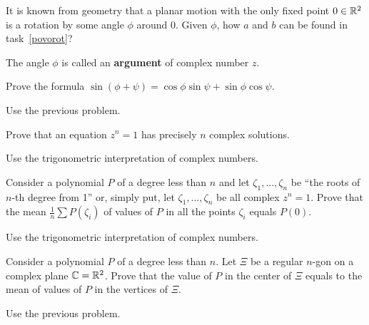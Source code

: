 \documentclass[12pt]{article}
\begin{document}
\begin{zadacha}[!]
  It is known from geometry that a planar motion with the only fixed
  point $0 \in {\mathbb R}^2$ is a rotation by some angle $\phi$ around $0$.
  Given $\phi$, how $a$ and $b$ can be found in task~\ref{povorot}?
\end{zadacha}

\begin{zamechanie}
The angle $\phi$ is called an {\bf argument} of complex number $z$.
\end{zamechanie}

\begin{zadacha}[!]
Prove the formula $\sin (\phi +\psi)= \cos\phi \sin \psi +
\sin\phi \cos \psi$.
\end{zadacha}

\begin{ukazanie}
Use the previous problem.
\end{ukazanie}

\begin{zadacha}[!]
Prove that an equation $z^n =1$ has precisely $n$ complex solutions.
\end{zadacha}

\begin{ukazanie}
Use the trigonometric interpretation of complex numbers.
\end{ukazanie}

\begin{zadacha}[*]
Consider a polynomial $P$ of a degree less than $n$ and let  $\zeta_1, \dots,
\zeta_n$ be ``the roots of $n$-th degree from 1''  or, simply put,
let $\zeta_1, \dots, \zeta_n$ be all complex $z^n =1$. Prove that the
mean $\frac 1 n \sum P(\zeta_i)$ of values of $P$ in all the points
$\zeta_i$ equals $P(0)$.
\end{zadacha}

\begin{ukazanie}
Use the trigonometric interpretation of complex numbers.
\end{ukazanie}

\begin{zadacha}[*]
Consider a polynomial $P$ of a degree less than $n$. Let $\Xi$ be a regular
$n$-gon on a complex plane ${\mathbb C} = {\mathbb R}^2$. Prove that the value of $P$ in
the center of $\Xi$ equals to the mean of values of $P$ in the
vertices of $\Xi$.
\end{zadacha}

\begin{ukazanie} Use the previous problem.
\end{ukazanie}
\end{document}
